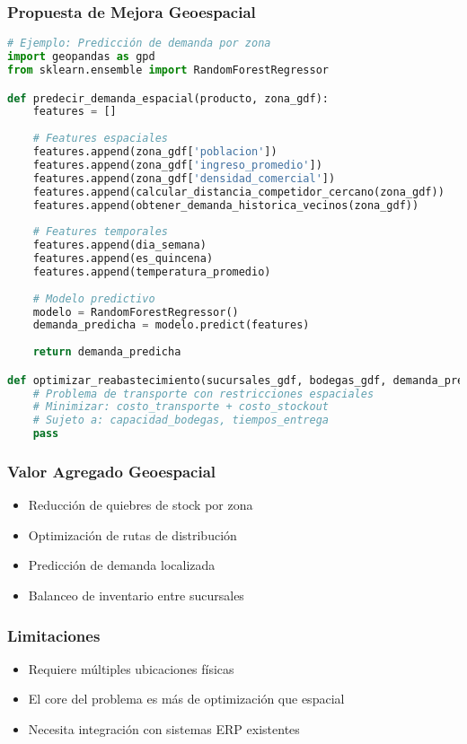 \documentclass[11pt,a4paper]{article}
\begin{document}
\subsubsection{Propuesta de Mejora Geoespacial}


\begin{lstlisting}[language=Python,basicstyle=\tiny]
# Ejemplo: Predicción de demanda por zona
import geopandas as gpd
from sklearn.ensemble import RandomForestRegressor

def predecir_demanda_espacial(producto, zona_gdf):
    features = []
    
    # Features espaciales
    features.append(zona_gdf['poblacion'])
    features.append(zona_gdf['ingreso_promedio'])
    features.append(zona_gdf['densidad_comercial'])
    features.append(calcular_distancia_competidor_cercano(zona_gdf))
    features.append(obtener_demanda_historica_vecinos(zona_gdf))
    
    # Features temporales
    features.append(dia_semana)
    features.append(es_quincena)
    features.append(temperatura_promedio)
    
    # Modelo predictivo
    modelo = RandomForestRegressor()
    demanda_predicha = modelo.predict(features)
    
    return demanda_predicha

def optimizar_reabastecimiento(sucursales_gdf, bodegas_gdf, demanda_predicha):
    # Problema de transporte con restricciones espaciales
    # Minimizar: costo_transporte + costo_stockout
    # Sujeto a: capacidad_bodegas, tiempos_entrega
    pass
\end{lstlisting}

\subsubsection{Valor Agregado Geoespacial}
\begin{itemize}
    \item Reducción de quiebres de stock por zona
    \item Optimización de rutas de distribución
    \item Predicción de demanda localizada
    \item Balanceo de inventario entre sucursales
\end{itemize}

\subsubsection{Limitaciones}
\begin{itemize}
    \item Requiere múltiples ubicaciones físicas
    \item El core del problema es más de optimización que espacial
    \item Necesita integración con sistemas ERP existentes
\end{itemize}
\end{document}
